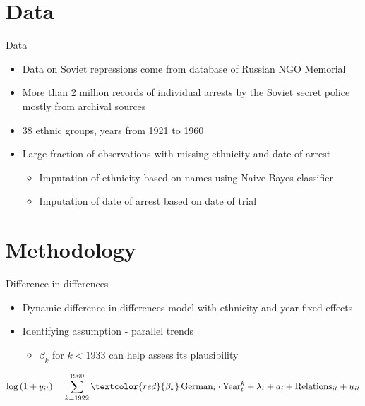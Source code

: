 \documentclass[11pt]{beamer}
\begin{document}
\section{Data}
\begin{frame}[label=data]{Data}
\begin{itemize}
    \item Data on Soviet repressions come from database of Russian NGO  Memorial
    \item More than 2 million records of individual arrests by the Soviet secret police mostly from archival sources
    \item 38 ethnic groups, years from 1921 to 1960
    \item Large fraction of observations with missing ethnicity and date of arrest 
    \begin{itemize}
        \item Imputation of ethnicity based on names using Naive Bayes  classifier  \hyperlink{ethnicity_imputation}{}
        \item Imputation of date of arrest based on date of trial \hyperlink{arrest_date_imputation}{}
    \end{itemize}
    
\end{itemize}
\end{frame}

\section{Methodology}
\begin{frame}{Difference-in-differences}
\begin{itemize}
    \item Dynamic difference-in-differences model with ethnicity and year fixed effects
    \item Identifying assumption - parallel trends 
    \begin{itemize}
        \item $\beta_k$ for $k < 1933$ can help assess its plausibility
    \end{itemize}
\end{itemize}

\begin{equation*}
 \log\left(1 + y_{it}\right) = \sum_{k= 1922}^{1960} \textcolor{red}{\beta_k}  \, \text{German}_{i} \cdot \text{Year}_{t}^k +  \lambda_t + a_i +  \text{Relations}_{it}   + u_{it}
 \label{eq:dynamic_did}
\end{equation*}
\end{frame}
\end{document}
